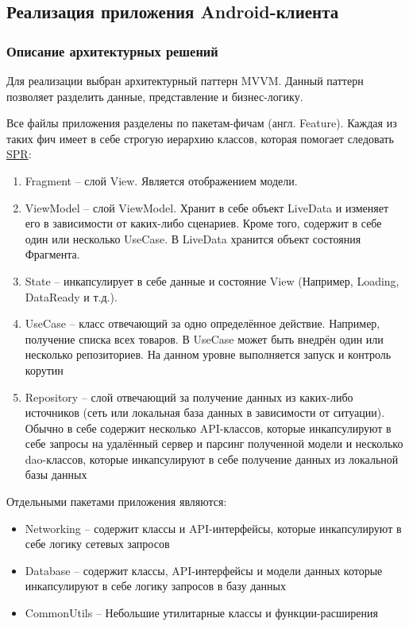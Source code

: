 \subsection{Реализация приложения Android-клиента}\label{subsec:3-impl-android}\indent

\subsubsection{Описание архитектурных решений}\indent

Для реализации выбран архитектурный паттерн MVVM. Данный паттерн позволяет разделить данные, представление и бизнес-логику.

Все файлы приложения разделены по пакетам-фичам (англ. Feature).
Каждая из таких фич имеет в себе строгую иерархию классов, которая помогает следовать \hyperlink{gloss:spr}{SPR}:
\begin{enumerate}
    \item Fragment – слой View.
    Является отображением модели.
    \item ViewModel – слой ViewModel.
    Хранит в себе объект LiveData и изменяет его в зависимости от каких-либо сценариев.
    Кроме того, содержит в себе один или несколько UseCase.
    В LiveData хранится объект состояния Фрагмента.
    \item State – инкапсулирует в себе данные и состояние View (Например, Loading, DataReady и т.д.).
    \item UseCase – класс отвечающий за одно определённое действие.
    Например, получение списка всех товаров.
    В UseCase может быть внедрён один или несколько репозиториев.
    На данном уровне выполняется запуск и контроль корутин
    \item Repository – слой отвечающий за получение данных из каких-либо источников (сеть или локальная база данных в зависимости от ситуации).
    Обычно в себе содержит несколько API-классов, которые инкапсулируют в себе запросы на удалённый сервер и парсинг полученной модели и несколько dao-классов, которые инкапсулируют в себе получение данных из локальной базы данных
\end{enumerate}

Отдельными пакетами приложения являются:
\begin{itemize}
    \item Networking – содержит классы и API-интерфейсы, которые инкапсулируют в себе логику сетевых запросов
    \item Database – содержит классы, API-интерфейсы и модели данных которые инкапсулируют в себе логику запросов в базу данных
    \item CommonUtils – Небольшие утилитарные классы и функции-расширения
\end{itemize}

